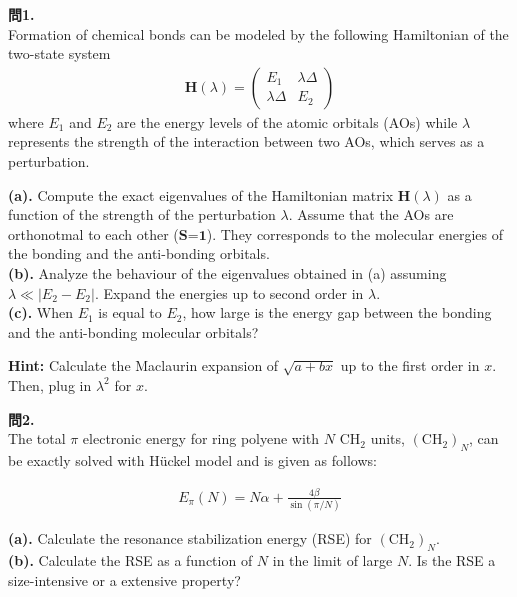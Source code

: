 \documentclass{jlreq}
\begin{document}
\noindent
\textbf{問1.}\\

\noindent
Formation of chemical bonds can be modeled by the following Hamiltonian of the two-state system
\begin{eqnarray}
    \mathbf{H}(\lambda)=
    \begin{pmatrix}
    E_1 & \lambda\Delta \\ 
    \lambda\Delta & E_2
    \end{pmatrix}
\end{eqnarray}
where $E_1$ and $E_2$ are the energy levels of the atomic orbitals (AOs) while $\lambda$ represents the strength of the interaction between two AOs, which serves as a perturbation.

\noindent
\textbf{(a).} Compute the exact eigenvalues of the Hamiltonian matrix $\mathbf{H}(\lambda)$ as a function of the strength of the perturbation $\lambda$. Assume that the AOs are orthonotmal to each other ($\mathbf{S}$=$\mathbf{1}$). They corresponds to the molecular energies of the bonding and the anti-bonding orbitals.\\
\noindent
\textbf{(b).} Analyze the behaviour of the eigenvalues obtained in (a)  assuming $\lambda \ll |E_2-E_2|$.  Expand the energies up to second order in $\lambda$.\\ 
\noindent
\textbf{(c).} When $E_1$ is equal to $E_2$, how large is the energy gap between the bonding and the anti-bonding molecular orbitals?

\noindent
\textbf{Hint:} Calculate the Maclaurin expansion of $\sqrt{a+bx}$ up to the first order in $x$. Then, plug in $\lambda^2$ for $x$. 

\clearpage

\noindent
\textbf{問2.}\\

\noindent
The total $\pi$ electronic energy for  ring polyene with $N$ $\text{CH}_2$ units, $(\text{CH}_2)_N$, can be exactly solved with H\"uckel model and is given as follows:

\begin{eqnarray}
    E_\pi(N)=N\alpha+\frac{4\beta}{\sin(\pi/N)}
\end{eqnarray}

\noindent
\textbf{(a).} Calculate the resonance stabilization energy (RSE) for  $(\text{CH}_2)_N$.\\
\noindent
\textbf{(b).} Calculate the RSE as a function of $N$ in the limit of large $N$. Is the RSE a size-intensive or a extensive property?
\end{document}
